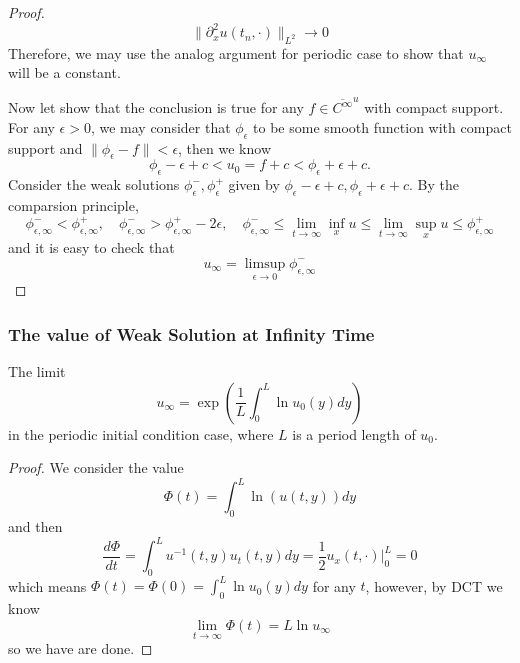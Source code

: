\begin{proof}
    \[\lVert \partial^2_x u(t_n,\cdot)\rVert_{L^2} \to 0\]
    Therefore, we may use the analog argument for periodic case to show that $u_{\infty}$ will be a constant.\par
    Now let show that the conclusion is true for any $f\in \overline{C^{\infty}}^u$ with compact support. For any $\epsilon > 0$, we may consider that $\phi_{\epsilon}$ to be some smooth function with compact support and $\lVert \phi_{\epsilon} - f\rVert <\epsilon$, then we know
    \[
    \phi_{\epsilon} - \epsilon +c < u_0 = f +c < \phi_{\epsilon} + \epsilon +c.
    \]
    Consider the weak solutions $\phi^-_{\epsilon},\phi^+_{\epsilon}$ given by $\phi_{\epsilon} - \epsilon +c, \phi_{\epsilon} + \epsilon +c$. By the comparsion principle,
    \[\phi^-_{\epsilon,\infty} < \phi^+_{\epsilon,\infty},\quad \phi^-_{\epsilon,\infty} > \phi^+_{\epsilon,\infty} - 2\epsilon,\quad\phi^-_{\epsilon,\infty} \leq \lim_{t\to \infty}\inf_x u \leq\lim_{t\to \infty}\sup_x u \leq \phi^+_{\epsilon,\infty} \]
    and it is easy to check that
    \[
    u_{\infty} = \limsup_{\epsilon \to 0} \phi^{-}_{\epsilon,\infty}
    \]
\end{proof}

\subsubsection{The value of Weak Solution at Infinity Time}

\begin{theorem}
    The limit
    \[
    u_{\infty} = \exp\left(\dfrac{1}{L}\int^L_0 \ln u_0(y)dy\right)
    \]
    in the periodic initial condition case, where $L$ is a period length of $u_0$.
\end{theorem}
\begin{proof}
    We consider the value
    \[
    \Phi(t) = \int_0^L \ln(u(t,y))dy
    \]
    and then
    \[
    \dfrac{d\Phi}{dt} = \int_0^L u^{-1}(t,y)u_t(t,y)dy = \dfrac{1}{2} u_x(t,\cdot)|^L_0 = 0
    \]
    which means $\Phi(t) = \Phi(0) = \int^L_0 \ln u_0(y)dy$ for any $t$, however, by DCT we know
    \[
    \lim_{t\to\infty} \Phi(t) = L \ln u_{\infty}
    \]
    so we have are done.
\end{proof}

